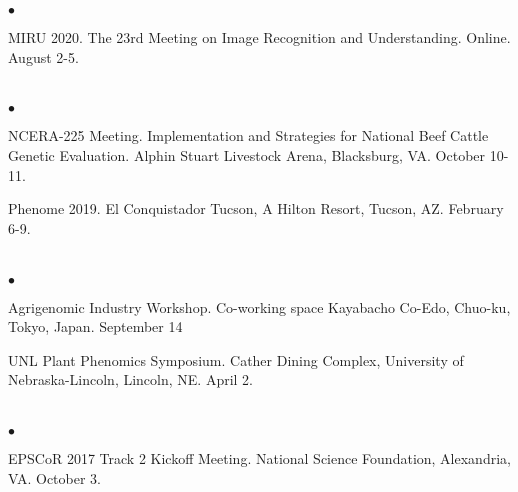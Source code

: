 \documentclass[margin,line,10pt]{res}
\newenvironment{list2}{
  \begin{list}{$\bullet$}{%
      \setlength{\itemsep}{0in}
      \setlength{\parsep}{0in} \setlength{\parskip}{0in}
      \setlength{\topsep}{0in} \setlength{\partopsep}{0in} 
      \setlength{\leftmargin}{0.2in}}}{\end{list}}
\begin{document}
\begin{resume}
\begin{list2}
      \vspace{0.5cm}

\item MIRU 2020. The 23rd Meeting on Image Recognition and Understanding. Online. August 2-5. 

\end{list2}



\section{}
\begin{list2}

\item NCERA-225 Meeting. Implementation and Strategies for National Beef Cattle Genetic Evaluation. Alphin Stuart Livestock Arena, Blacksburg, VA. October 10-11.

  \vspace{0.5cm}

\item Phenome 2019. El Conquistador Tucson, A Hilton Resort, Tucson, AZ. February 6-9.

\end{list2}




\section{}
\begin{list2}

  \item Agrigenomic Industry Workshop. Co-working space Kayabacho Co-Edo, Chuo-ku, Tokyo, Japan. September 14

    \vspace{0.5cm}
    
\item UNL Plant Phenomics Symposium. Cather Dining Complex, University of Nebraska-Lincoln, Lincoln, NE. April 2.

\end{list2}


\section{}
\begin{list2}

\item EPSCoR 2017 Track 2 Kickoff Meeting.  National Science Foundation, Alexandria, VA. October 3.
  

\end{list2}
\end{resume}
\end{document}
